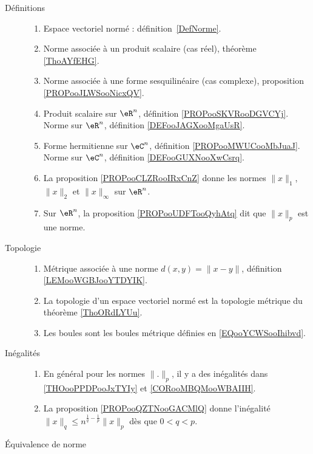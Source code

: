 
      \label{THEMEooUJVXooZdlmHj}

\begin{description}
	\item[Définitions]
	      \begin{enumerate}
		      \item
		            Espace vectoriel normé : définition~\ref{DefNorme}.
		      \item
		            Norme associée à un produit scalaire (cas réel), théorème \ref{ThoAYfEHG}.
		      \item
		            Norme associée à une forme sesquilinéaire (cas complexe), proposition \ref{PROPooJLWSooNicxQV}.
		      \item
		            Produit scalaire sur \( \eR^n\), définition \ref{PROPooSKVRooDGVCYj}. Norme sur \( \eR^n\), définition \ref{DEFooJAGXooMgaUsR}.
		      \item
		            Forme hermitienne sur \( \eC^n\), définition \ref{PROPooMWUCooMbJuaJ}. Norme sur \( \eC^n\), définition \ref{DEFooGUXNooXwCsrq}.
		      \item
		            La proposition \ref{PROPooCLZRooIRxCnZ} donne les normes \( \| x \|_1\), \( \| x \|_2\) et \( \| x \|_{\infty}\) sur \( \eR^n\).
		      \item
		            Sur \( \eR^n\), la proposition \ref{PROPooUDFTooQyhAtq} dit que \( \| x \|_p\) est une norme.
	      \end{enumerate}
	\item[Topologie]
	      \begin{enumerate}
		      \item
		            Métrique associée à une norme \( d(x,y)=\| x-y \|\), définition \ref{LEMooWGBJooYTDYIK}.
		      \item
		            La topologie d'un espace vectoriel normé est la topologie métrique du théorème \ref{ThoORdLYUu}.
		      \item
		            Les boules sont les boules métrique définies en \eqref{EQooYCWSooIhibvd}.
	      \end{enumerate}
	\item[Inégalités]
	      \begin{enumerate}
		      \item
		            En général pour les normes \( \| . \|_p\), il y a des inégalités dans \ref{THOooPPDPooJxTYIy} et \ref{CORooMBQMooWBAIIH}.
		      \item
		            La proposition \ref{PROPooQZTNooGACMlQ} donne l'inégalité \( \| x \|_q\leq n^{\frac{1}{ q }-\frac{1}{ p }}\| x \|_p\) dès que \( 0<q<p\).
	      \end{enumerate}
	\item[Équivalence de norme]


\end{description}
